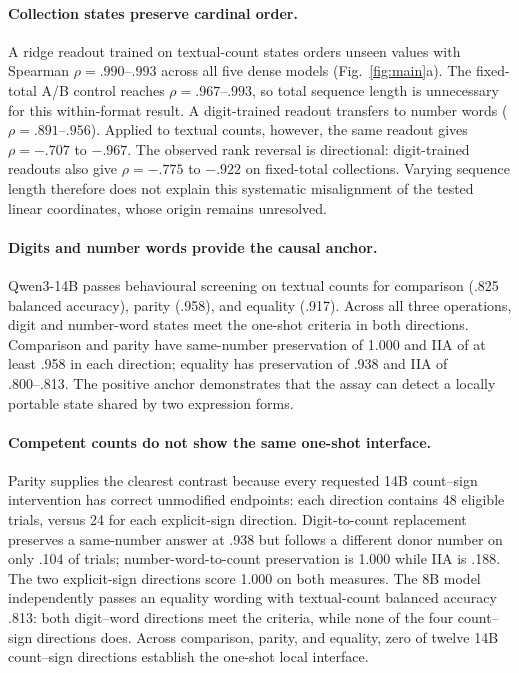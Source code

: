 \documentclass[11pt]{article}
\begin{document}
\paragraph{Collection states preserve cardinal order.}

A ridge readout trained on textual-count states orders unseen values with
Spearman $\rho=.990$--$.993$ across all five dense models
(Fig.~\ref{fig:main}a). The fixed-total A/B control reaches
$\rho=.967$--$.993$, so total sequence length is unnecessary for this
within-format result. A digit-trained readout transfers to number words
($\rho=.891$--$.956$). Applied to textual counts, however, the same readout
gives $\rho=-.707$ to $-.967$. The observed rank reversal is directional:
digit-trained readouts also give $\rho=-.775$ to $-.922$ on fixed-total
collections. Varying sequence length therefore does not explain this
systematic misalignment of the tested linear coordinates, whose origin
remains unresolved.

\paragraph{Digits and number words provide the causal anchor.}

Qwen3-14B passes behavioural screening on textual counts for comparison (.825
balanced accuracy), parity (.958), and equality (.917). Across all three
operations, digit and number-word states meet the one-shot criteria in both
directions. Comparison and parity have same-number preservation of 1.000 and
IIA of at least .958 in each direction; equality has preservation of .938 and
IIA of .800--.813. The positive anchor demonstrates that the assay can detect
a locally portable state shared by two expression forms.

\paragraph{Competent counts do not show the same one-shot interface.}

Parity supplies the clearest contrast because every requested 14B
count--sign intervention has correct unmodified endpoints: each direction
contains 48 eligible trials, versus 24 for each explicit-sign direction.
Digit-to-count replacement
preserves a same-number answer at .938 but follows a different donor number
on only .104 of trials; number-word-to-count preservation is 1.000 while IIA
is .188. The two explicit-sign directions score 1.000 on both measures. The
8B model independently passes an equality wording with textual-count
balanced accuracy .813: both digit--word directions meet the criteria, while
none of the four count--sign directions does. Across comparison, parity,
and equality, zero of twelve 14B count--sign directions establish the
one-shot local interface.
\end{document}
